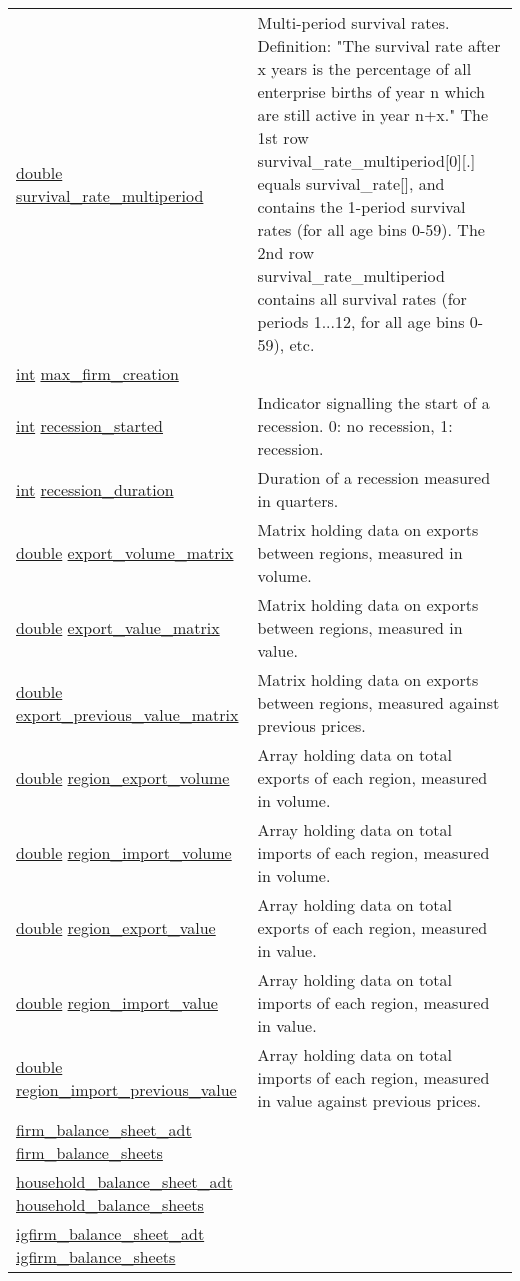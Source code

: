 \documentclass[a4paper,11pt]{article}
\begin{document}
\begin{center}
\begin{longtable}[H!]{ll}
\url{double} \url{survival_rate_multiperiod} & \parbox{10cm}{Multi-period survival rates. Definition: "The survival rate after x years is the percentage of all enterprise births of year n which are still active in year n+x." The 1st row survival\_rate\_multiperiod[0][.] equals survival\_rate[], and contains the 1-period survival rates (for all age bins 0-59). The 2nd row survival\_rate\_multiperiod contains all survival rates (for periods 1...12, for all age bins 0-59), etc.} \\
\url{int} \url{max_firm_creation} & \parbox{10cm}{} \\
\url{int} \url{recession_started} & \parbox{10cm}{Indicator signalling the start of a recession. 0: no recession, 1: recession.} \\
\url{int} \url{recession_duration} & \parbox{10cm}{Duration of a recession measured in quarters.} \\
\url{double} \url{export_volume_matrix} & \parbox{10cm}{Matrix holding data on exports between regions, measured in volume.} \\
\url{double} \url{export_value_matrix} & \parbox{10cm}{Matrix holding data on exports between regions, measured in value.} \\
\url{double} \url{export_previous_value_matrix} & \parbox{10cm}{Matrix holding data on exports between regions, measured against previous prices.} \\
\url{double} \url{region_export_volume} & \parbox{10cm}{Array holding data on total exports of each region, measured in volume.} \\
\url{double} \url{region_import_volume} & \parbox{10cm}{Array holding data on total imports of each region, measured in volume.} \\
\url{double} \url{region_export_value} & \parbox{10cm}{Array holding data on total exports of each region, measured in value.} \\
\url{double} \url{region_import_value} & \parbox{10cm}{Array holding data on total imports of each region, measured in value.} \\
\url{double} \url{region_import_previous_value} & \parbox{10cm}{Array holding data on total imports of each region, measured in value against previous prices.} \\
\url{firm_balance_sheet_adt} \url{firm_balance_sheets} & \parbox{10cm}{} \\
\url{household_balance_sheet_adt} \url{household_balance_sheets} & \parbox{10cm}{} \\
\url{igfirm_balance_sheet_adt} \url{igfirm_balance_sheets} & \parbox{10cm}{} \\

\end{longtable}
\end{center}
\end{document}
